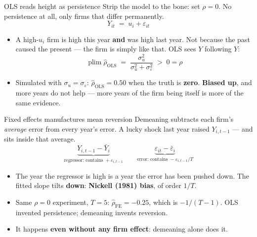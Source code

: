 \documentclass[
  11pt,
  ignorenonframetext,
  aspectratio=169,
]{beamer}
\providecommand{\tightlist}{%
  \setlength{\itemsep}{0pt}\setlength{\parskip}{0pt}}
\begin{document}
\begin{frame}{OLS reads height as persistence}
\protect{}\label{ols-reads-height-as-persistence}
Strip the model to the bone: set \(\rho = 0\). No persistence at all,
only firms that differ permanently. \[
Y_{it} \;=\; u_i + \varepsilon_{it}
\]

\begin{itemize}
\tightlist
\item
  A high-\(u_i\) firm is high this year \textbf{and} was high last year.
  Not because the past caused the present --- the firm is simply like
  that. OLS sees \(Y\) following \(Y\): \[
  \operatorname{plim}\hat\rho_{\text{OLS}} \;=\; \frac{\sigma^2_u}{\sigma^2_u + \sigma^2_\varepsilon} \;>\; 0 = \rho
  \]
\item
  Simulated with \(\sigma_u = \sigma_\varepsilon\):
  \(\hat\rho_{\text{OLS}} = 0.50\) when the truth is \textbf{zero}.
  \textbf{Biased up}, and more years do not help --- more years of the
  firm being itself is more of the same evidence.
\end{itemize}
\end{frame}

\begin{frame}{Fixed effects manufactures mean reversion}
\protect{}\label{fixed-effects-manufactures-mean-reversion}
Demeaning subtracts each firm's \emph{average} error from every year's
error. A lucky shock last year raised \(Y_{i,t-1}\) --- and sits inside
that average. \[
\underbrace{Y_{i,t-1} - \bar Y_{i}}_{\text{regressor: contains } +\varepsilon_{i,t-1}}
\qquad
\underbrace{\varepsilon_{it} - \bar\varepsilon_{i}}_{\text{error: contains } -\varepsilon_{i,t-1}/T}
\]

\begin{itemize}
\tightlist
\item
  The year the regressor is high is a year the error has been pushed
  down. The fitted slope tilts \textbf{down}: \textbf{Nickell (1981)
  bias}, of order \(1/T\).
\item
  Same \(\rho = 0\) experiment, \(T = 5\):
  \(\hat\rho_{\text{FE}} = -0.25\), which is \(-1/(T-1)\). OLS invented
  persistence; demeaning invents reversion.
\item
  It happens \textbf{even without any firm effect}: demeaning alone does
  it.
\end{itemize}
\end{frame}
\end{document}
